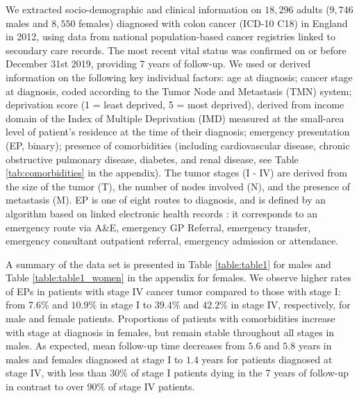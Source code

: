 \documentclass[12pt]{article}
\begin{document}
We extracted socio-demographic and clinical information on $18,296$ adults ($9,746$ males and $8,550$ females) diagnosed with colon cancer (ICD-10 C18) in England in 2012, using data from national population-based cancer registries linked to secondary care records. The most recent vital status was confirmed on or before December 31st 2019, providing 7 years of follow-up. 
We used or derived information on the following key individual factors: age at diagnosis; cancer stage at diagnosis, coded according to the Tumor Node and Metastasis (TMN) system; deprivation score (1 = least deprived, 5 = most deprived), derived from income domain of the Index of Multiple Deprivation (IMD) measured at the small-area level of patient's residence at the time of their diagnosis; emergency presentation (EP, binary); presence of comorbidities (including cardiovascular disease, chronic obstructive pulmonary disease, diabetes, and renal disease, see Table \ref{tab:comorbidities} in the appendix). The tumor stages (I - IV) are derived from the size of the tumor (T), the number of nodes involved (N), and the presence of metastasis (M). EP is one of eight routes to diagnosis, and is defined by an algorithm based on linked electronic health records \citep{elliss:2012}: it corresponds to an emergency route via A\&E, emergency GP Referral, emergency transfer, emergency consultant outpatient referral, emergency admission or attendance.

A summary of the data set is presented in Table \ref{table:table1} for males and Table \ref{table:table1_women} in the appendix for females. We observe higher rates of EPs in patients with stage IV cancer tumor compared to those with stage I: from $7.6\%$ and $10.9\%$ in stage I to $39.4\%$ and $42.2\%$ in stage IV, respectively, for male and female patients. Proportions of patients with comorbidities increase with stage at diagnosis in females, but remain stable throughout all stages in males. As expected, mean follow-up time decreases from $5.6$ and $5.8$ years in males and females diagnosed at stage I to $1.4$ years for patients diagnosed at stage IV, with less than $30\%$ of stage I patients dying in the 7 years of follow-up in contrast to over $90\%$ of stage IV patients.
\end{document}
